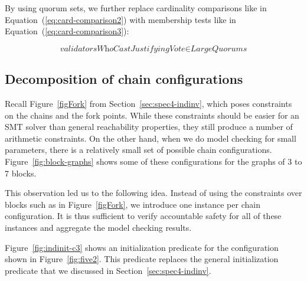 By using quorum sets, we further replace cardinality comparisons like in
Equation~(\ref{eq:card-comparison2}) with membership tests like in
Equation~(\ref{eq:card-comparison3}):

\begin{equation}
    \textit{validatorsWhoCastJustifyingVote} \in \textit{LargeQuorums}
    \label{eq:card-comparison3}
\end{equation}


\subsection{Decomposition of chain configurations}\label{sec:decomposition}

Recall Figure~\ref{figFork} from Section~\ref{sec:spec4-indinv}, which poses
constraints on the chains and the fork points. While these constraints should
be easier for an SMT solver than general reachability properties, they
still produce a number of arithmetic constraints. On the other hand, when we do
model checking for small parameters, there is a relatively small set of
possible chain configurations.  Figure~\ref{fig:block-graphs} shows some of
these configurations for the graphs of 3 to 7 blocks.

This observation led us to the following idea. Instead of using the constraints
over blocks such as in Figure~\ref{figFork}, we introduce one instance per
chain configuration. It is thus sufficient to verify accountable safety for all
of these instances and aggregate the model checking results.

Figure~\ref{fig:indinit-c3} shows an initialization predicate for the
configuration shown in Figure~\ref{fig:five2}. This predicate replaces the
general initialization predicate that we discussed in
Section~\ref{sec:spec4-indinv}.

